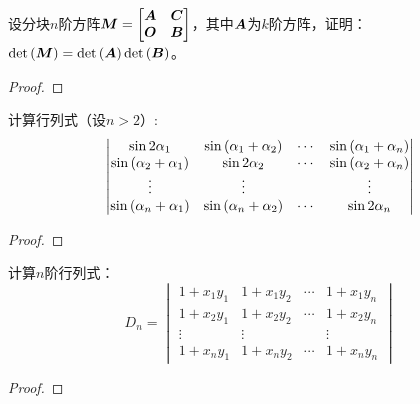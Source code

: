 \setcounter{problem}{20}
\begin{problem}
设分块\(n\)阶方阵\(\boldsymbol{M}=\begin{bmatrix}\boldsymbol{A}&\boldsymbol{C}\\\boldsymbol{O}&\boldsymbol{B}\end{bmatrix}\)，其中\(\boldsymbol{A}\)为\(k\)阶方阵，证明：\(\mathrm{det}\left( \boldsymbol{M} \right)=\mathrm{det}\left( \boldsymbol{A} \right)\mathrm{det}\left( \boldsymbol{B} \right)\)。
\end{problem}
\begin{proof}

\end{proof}

\setcounter{problem}{22}
\begin{problem}
计算行列式（设\(n>2\)）:
\begin{equation*}
    \begin{vmatrix}
        \sin 2\alpha_1                    & \sin\left( \alpha_{1}+\alpha_{2} \right) & \cdots & \sin\left( \alpha_{1}+\alpha_{n} \right) \\
        \sin\left( \alpha_{2}+\alpha_{1} \right) & \sin 2\alpha_2                    & \cdots & \sin\left( \alpha_{2}+\alpha_{n} \right) \\
        \vdots                            & \vdots                            &        & \vdots                            \\
        \sin\left( \alpha_{n}+\alpha_{1} \right) & \sin\left( \alpha_{n}+\alpha_{2} \right) & \cdots & \sin 2\alpha_n
    \end{vmatrix}
\end{equation*}
\end{problem}
\begin{proof}

\end{proof}

\setcounter{problem}{26}
\begin{problem}
计算\(n\)阶行列式：
\begin{equation*}
    D_n=
    \begin{vmatrix}
        1+x_{1}y_{1} & 1+x_{1}y_{2} & \cdots & 1+x_{1}y_{n} \\
        1+x_{2}y_{1} & 1+x_{2}y_{2} & \cdots & 1+x_{2}y_{n} \\
        \vdots       & \vdots       &        & \vdots       \\
        1+x_{n}y_{1} & 1+x_{n}y_{2} & \cdots & 1+x_{n}y_{n}
    \end{vmatrix}
\end{equation*}
\end{problem}
\begin{proof}

\end{proof}
